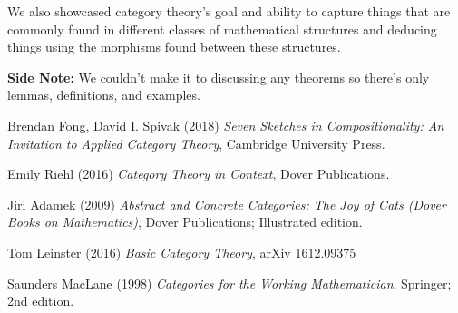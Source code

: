 \documentclass[12pt]{article}
\theoremstyle{definition}
\theoremstyle{remark}
\begin{document}
    We also showcased category theory's goal and ability to capture things that are commonly found in different classes of mathematical structures and deducing things using the morphisms found between these structures.  
 
    \textbf{Side Note:} We couldn't make it to discussing any theorems so there's only lemmas, definitions, and examples. 



    
    \begin{thebibliography}{9}
        Brendan Fong, David I. Spivak (2018) \emph{Seven Sketches in Compositionality: An Invitation to Applied Category Theory}, Cambridge University Press.

        Emily Riehl (2016) \emph{Category Theory in Context}, Dover Publications.
        
        Jiri Adamek (2009) \emph{Abstract and Concrete Categories: The Joy of Cats (Dover Books on Mathematics)}, Dover Publications; Illustrated edition.
        
        Tom Leinster (2016) \emph{Basic Category Theory}, arXiv 1612.09375

        Saunders MacLane (1998) \emph{Categories for the Working Mathematician}, Springer; 2nd edition.
        
    
    \end{thebibliography}
\end{document}
